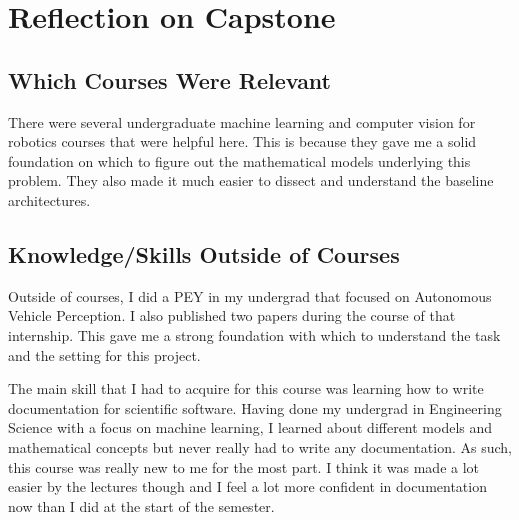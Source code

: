 \documentclass{article}
\begin{document}
\section{Reflection on Capstone}


\subsection{Which Courses Were Relevant}

There were several undergraduate machine learning and computer vision for robotics courses that were helpful here. This is because they gave me a solid foundation 
on which to figure out the mathematical models underlying this problem. They also made it much easier to dissect and understand the baseline architectures.

\subsection{Knowledge/Skills Outside of Courses}

Outside of courses, I did a PEY in my undergrad that focused on Autonomous Vehicle Perception. I also published two papers during the course of that internship. This 
gave me a strong foundation with which to understand the task and the setting for this project. 

The main skill that I had to acquire for this course was learning how to write documentation for scientific software. Having done my undergrad in Engineering Science with a focus on 
machine learning, I learned about different models and mathematical concepts but never really had to write any documentation. As such, this course was really new to me for the most part.
I think it was made a lot easier by the lectures though and I feel a lot more confident in documentation now than I did at the start of the semester.
\end{document}
